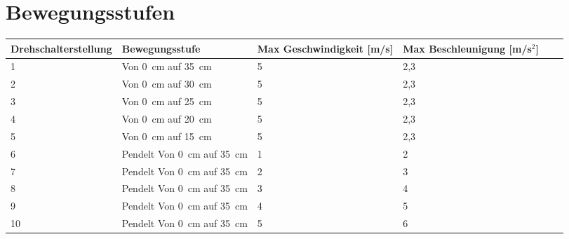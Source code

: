 %
%

\chapter{Bewegungsstufen} \label{bew}


\fontsize{8}{10}\selectfont
\begin{tabularx}{\textwidth}{|p{3cm}|X|X|X|p{1cm}|X|}
	\hline 
	\textbf{Drehschalterstellung}  & \textbf{Bewegungsstufe} & \textbf{Max Geschwindigkeit [m/s]} &  \textbf{Max Beschleunigung [m/s$^{2}$]} \\ \hline
	1 & Von 0\ cm auf 35\ cm & 5 & 2,3   \\
	\hline
	2 & Von 0\ cm auf 30\ cm & 5 & 2,3 \\
	\hline
	3 & Von 0\ cm auf 25\ cm & 5 & 2,3 \\
	\hline
	4 & Von 0\ cm auf 20\ cm & 5 & 2,3 \\
	\hline
	5 & Von 0\ cm auf 15\ cm & 5 & 2,3 \\
	\hline
	6 & Pendelt Von 0\ cm auf 35\ cm & 1 & 2 \\
	\hline
	7 &Pendelt Von 0\ cm auf 35\ cm & 2 & 3 \\
	\hline
	8 & Pendelt Von 0\ cm auf 35\ cm & 3 & 4 \\
	\hline
	9 & Pendelt Von 0\ cm auf 35\ cm & 4 & 5 \\
	\hline
	10 & Pendelt Von 0\ cm auf 35\ cm & 5 & 6 \\
	\hline
	
	
\end{tabularx}



